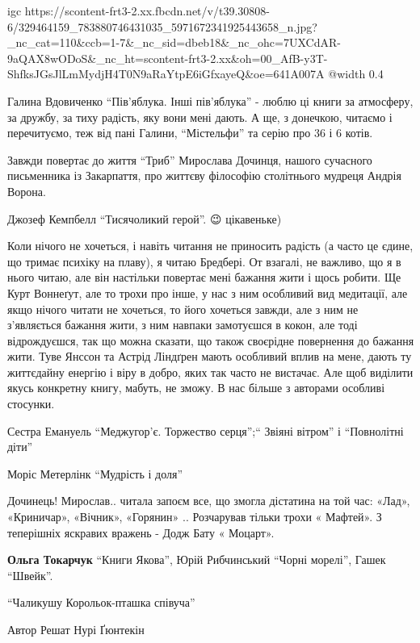 \ifcmt
  igc https://scontent-frt3-2.xx.fbcdn.net/v/t39.30808-6/329464159_783880746431035_5971672341925443658_n.jpg?_nc_cat=110&ccb=1-7&_nc_sid=dbeb18&_nc_ohc=7UXCdAR-9aQAX8wODoS&_nc_ht=scontent-frt3-2.xx&oh=00_AfB-y3T-ShfksJGsJlLmMydjH4T0N9aRaYtpE6iGfxayeQ&oe=641A007A
	@width 0.4
\fi


Галина Вдовиченко \enquote{Пів'яблука. Інші пів'яблука} - люблю ці книги за атмосферу,
за дружбу, за тиху радість, яку вони мені дають. А ще, з донечкою, читаємо і
перечитуємо, теж від пані Галини, \enquote{Містельфи} та серію про 36 і 6 котів.


Завжди повертає до життя \enquote{Триб} Мирослава Дочинця, нашого сучасного письменника
із Закарпаття, про життєву філософію столітнього мудреця Андрія Ворона.


Джозеф Кемпбелл \enquote{Тисячоликий герой}. 😉 цікавеньке)


Коли нічого не хочеться, і навіть читання не приносить радість (а часто це
єдине, що тримає психіку на плаву), я читаю Бредбері. От взагалі, не важливо,
що я в нього читаю, але він настільки повертає мені бажання жити і щось робити.
Ще Курт Воннеґут, але то трохи про інше, у нас з ним особливий вид медитації,
але якщо нічого читати не хочеться, то його хочеться завжди, але з ним не
з'являється бажання жити, з ним навпаки замотуєшся в кокон, але тоді
відрождуєшся, так що можна сказати, що також своєрідне повернення до бажання
жити. Туве Янссон та Астрід Ліндґрен мають особливий вплив на мене, дають ту
життєдайну енергію і віру в добро, яких так часто не вистачає. Але щоб виділити
якусь конкретну книгу, мабуть, не зможу. В нас більше з авторами особливі
стосунки.


Сестра Емануель \enquote{Меджугор'є. Торжество серця};\enquote{ Звіяні вітром}
і \enquote{Повнолітні діти}


Моріс Метерлінк \enquote{Мудрість і доля}


Дочинець! Мирослав.. читала запоєм все, що змогла дістатина на той час: «Лад»,
«Криничар», «Вічник», «Горянин» .. Розчарував тільки трохи « Мафтей». З
теперішніх яскравих вражень - Додж Бату « Моцарт».

\textbf{Ольга Токарчук} \enquote{Книги Якова}, Юрій Рибчинський \enquote{Чорні морелі}, Гашек \enquote{Швейк}.


\enquote{Чаликушу Корольок-пташка співуча}

Автор Решат Нурі Ґюнтекін
